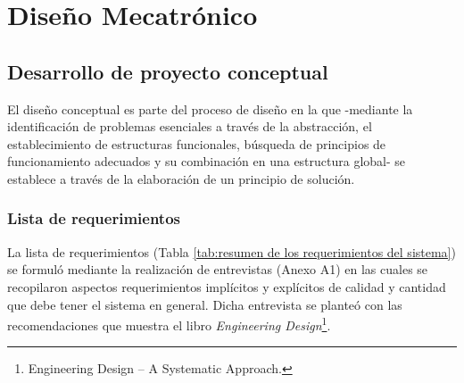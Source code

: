 
\doublespacing
\chapter{Diseño Mecatrónico}

\section{Desarrollo de proyecto conceptual}

El diseño conceptual es parte del proceso de diseño en la que -mediante la identificación de problemas esenciales a través de la abstracción, el establecimiento de estructuras funcionales, búsqueda de principios de funcionamiento adecuados y su combinación en una estructura global- se establece a través de la elaboración de un principio de solución.\cite[p.~159]{Pahl2007}

\subsection{Lista de requerimientos}

La lista de requerimientos (Tabla \ref{tab:resumen de los requerimientos del sistema}) se formuló mediante la realización de entrevistas (Anexo  A1) en las cuales se recopilaron aspectos requerimientos implícitos y explícitos de calidad y cantidad que debe tener el sistema en general. Dicha entrevista se planteó con las recomendaciones que muestra el libro \textit{Engineering Design}\footnote{Engineering Design – A Systematic Approach.\cite[p.~144-158]{Pahl2007}}.

